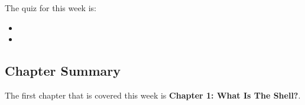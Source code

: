 The quiz for this week is:

\begin{itemize}
    \item {}
    \item {}
\end{itemize}

\newpage

\subsection{Chapter Summary}

The first chapter that is covered this week is \textbf{Chapter 1: What Is The Shell?}.

